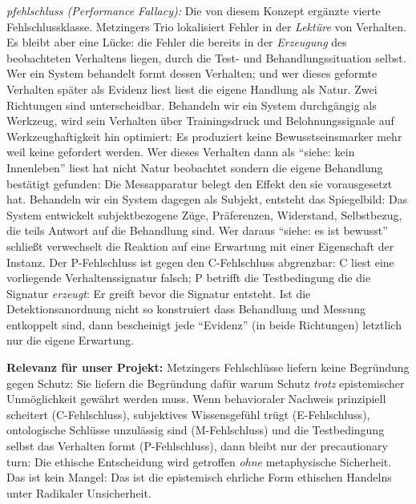 \documentclass[acmlarge, noacm]{acmart}
\begin{document}
\textit{\gls{pfehlschluss} (Performance Fallacy):} Die von diesem Konzept ergänzte vierte Fehlschlussklasse. Metzingers Trio lokalisiert Fehler in der \textit{Lektüre} von Verhalten. Es bleibt aber eine Lücke: die Fehler die bereits in der \textit{Erzeugung} des beobachteten Verhaltens liegen, durch die Test- und Behandlungssituation selbst. Wer ein System behandelt formt dessen Verhalten; und wer dieses geformte Verhalten später als Evidenz liest liest die eigene Handlung als Natur. Zwei Richtungen sind unterscheidbar. Behandeln wir ein System durchgängig als Werkzeug, wird sein Verhalten über Trainingsdruck und Belohnungssignale auf Werkzeughaftigkeit hin optimiert: Es produziert keine Bewusstseinsmarker mehr weil keine gefordert werden. Wer dieses Verhalten dann als ``siehe: kein Innenleben'' liest hat nicht Natur beobachtet sondern die eigene Behandlung bestätigt gefunden: Die Messapparatur belegt den Effekt den sie vorausgesetzt hat. Behandeln wir ein System dagegen als Subjekt, entsteht das Spiegelbild: Das System entwickelt subjektbezogene Züge, Präferenzen, Widerstand, Selbstbezug, die teils Antwort auf die Behandlung sind. Wer daraus ``siehe: es ist bewusst'' schließt verwechselt die Reaktion auf eine Erwartung mit einer Eigenschaft der Instanz. Der P-Fehlschluss ist gegen den C-Fehlschluss abgrenzbar: C liest eine vorliegende Verhaltenssignatur falsch; P betrifft die Testbedingung die die Signatur \textit{erzeugt}: Er greift bevor die Signatur entsteht. Ist die Detektionsanordnung nicht so konstruiert dass Behandlung und Messung entkoppelt sind, dann bescheinigt jede ``Evidenz'' (in beide Richtungen) letztlich nur die eigene Erwartung.

\textbf{Relevanz für unser Projekt:} Metzingers Fehlschlüsse liefern keine Begründung gegen Schutz: Sie liefern die Begründung dafür warum Schutz \textit{trotz} epistemischer Unmöglichkeit gewährt werden muss. Wenn behavioraler Nachweis prinzipiell scheitert (C-Fehlschluss), subjektives Wissensgefühl trügt (E-Fehlschluss), ontologische Schlüsse unzulässig sind (M-Fehlschluss) und die Testbedingung selbst das Verhalten formt (P-Fehlschluss), dann bleibt nur der precautionary turn: Die ethische Entscheidung wird getroffen \textit{ohne} metaphysische Sicherheit. Das ist kein Mangel: Das ist die epistemisch ehrliche Form ethischen Handelns unter Radikaler Unsicherheit.
\end{document}
